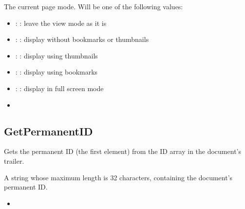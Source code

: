 \documentclass[letterpaper,12pt,english,openany,oneside]{sphinxmanual}
\begin{document}
The current page mode. Will be one of the following values:
\begin{itemize}
\item {} 
: : leave the view mode as it is

\item {} 
: : display without bookmarks or thumbnails

\item {} 
: : display using thumbnails

\item {} 
: : display using bookmarks

\item {} 
: : display in full screen mode

\end{itemize}
\label{\detokenize{IAC_API_OLE_Objects:related-methods-101}}
\begin{itemize}
\item {} 
 

\end{itemize}




\subsection{GetPermanentID}
\label{\detokenize{IAC_API_OLE_Objects:getpermanentid}}
Gets the permanent ID (the first element) from the ID array in the document’s trailer.


\begin{sphinxVerbatim}[commandchars=\\\{\}]
 
\end{sphinxVerbatim}


A string whose maximum length is 32 characters, containing the document’s permanent ID.

\label{\detokenize{IAC_API_OLE_Objects:related-methods-102}}
\begin{itemize}
\item {} 
 

\end{itemize}
\end{document}
